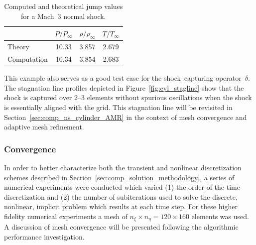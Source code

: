 \begin{table}[hbtp]
  \begin{center}
    \caption{Computed and theoretical jump values for a Mach~3 normal shock.\label{table:cyl_jumps}}
    \vspace{1em}
    \begin{tabular}{l||ccc} \hline\hline
                                   & $P/P_\infty$ & $\rho/\rho_\infty$ & $T/T_\infty$ \\ \hline
      Theory~\cite{naca_1135} & 10.33 & 3.857 & 2.679 \\ 
      Computation             & 10.34 & 3.854 & 2.683 \\ \hline \hline
    \end{tabular}
  \end{center}
\end{table}

This example also serves as a good test case for the shock--capturing operator~$\delta$.  The stagnation line profiles depicted in Figure~\ref{fig:cyl_stagline} show that the shock is captured over 2--3 elements without spurious oscillations when the shock is essentially aligned with the grid.  This stagnation line will be revisited in Section~\ref{sec:comp_ns_cylinder_AMR} in the context of mesh convergence and adaptive mesh refinement.

\subsubsection{Convergence}
In order to better characterize both the transient and nonlinear discretization schemes described in Section~\ref{sec:comp_solution_methodology}, a series of numerical experiments were conducted which varied (1) the order of the time discretization and (2) the number of subiterations used to solve the discrete, nonlinear, implicit problem which results at each time step. For these higher fidelity numerical experiments a mesh of $n_\xi\times n_\eta=120\times 160$ elements was used. A discussion of mesh convergence will be presented following the algorithmic performance investigation.

